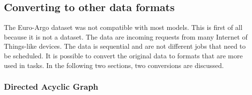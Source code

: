 

\subsection{Converting to other data formats}

The Euro-Argo dataset was not compatible with most models. This is first of
all because it is not a \jss dataset. The data are incoming requests from many
Internet of Things-like devices. The data is sequential and are not different
jobs that need to be scheduled. It is possible to convert the original data to
formats that are more used in \jss tasks. In the following two sections, two
conversions are discussed.


\subsubsection{Directed Acyclic Graph}\label{sec:dag}

